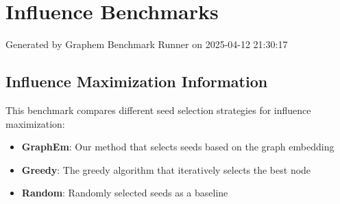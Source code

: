 \documentclass{article}
\begin{document}
\section*{Influence Benchmarks}
Generated by Graphem Benchmark Runner on 2025-04-12 21:30:17
\subsection*{Influence Maximization Information}
This benchmark compares different seed selection strategies for influence maximization:
\begin{itemize}
\item \textbf{GraphEm}: Our method that selects seeds based on the graph embedding
\item \textbf{Greedy}: The greedy algorithm that iteratively selects the best node
\item \textbf{Random}: Randomly selected seeds as a baseline
\end{itemize}
\end{document}
